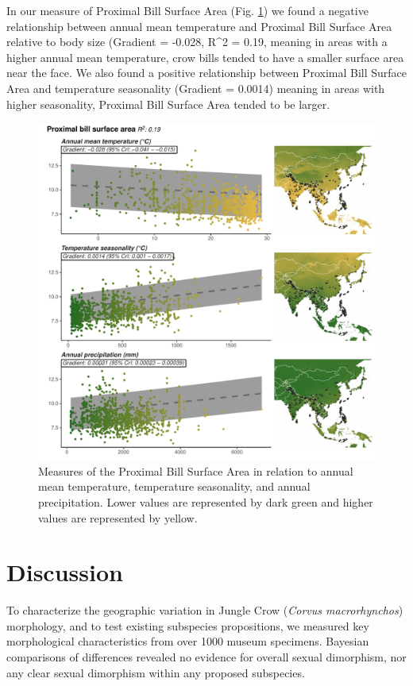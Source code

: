 \documentclass[10pt,a4paper]{article}
\begin{document}
In our measure of Proximal Bill Surface Area (Fig. \ref{fig:climateComparisonMapPBSA}) we found a negative relationship between annual mean temperature and Proximal Bill Surface Area relative to body size (Gradient = -0.028, R\^{}2 = 0.19, meaning in areas with a higher annual mean temperature, crow bills tended to have a smaller surface area near the face.
We also found a positive relationship between Proximal Bill Surface Area and temperature seasonality (Gradient = 0.0014) meaning in areas with higher seasonality, Proximal Bill Surface Area tended to be larger.

\begin{figure}
\includegraphics[width=0.9\linewidth]{../Figures/climMap_ExCuNtBTxHaNaTaLe} \caption{Measures of the Proximal Bill Surface Area in relation to annual mean temperature, temperature seasonality, and annual precipitation. Lower values are represented by dark green and higher values are represented by yellow.}\label{fig:climateComparisonMapPBSA}
\end{figure}

\section{Discussion}\label{discussion}

To characterize the geographic variation in Jungle Crow (\emph{Corvus macrorhynchos}) morphology, and to test existing subspecies propositions, we measured key morphological characteristics from over 1000 museum specimens.
Bayesian comparisons of differences revealed no evidence for overall sexual dimorphism, nor any clear sexual dimorphism within any proposed subspecies.
\end{document}
